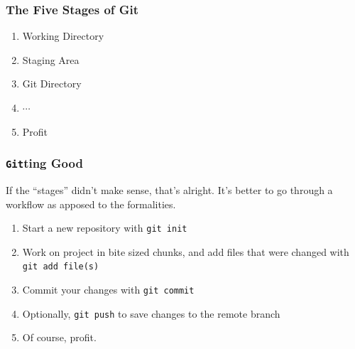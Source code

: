 \documentclass{beamer}
\newcommand{\shellcmd}[1]{\texttt{\colorbox{gray!30}{#1}}}
\begin{document}
\begin{frame}
    \frametitle{The Five Stages of Git}

    \begin{enumerate}
        \item Working Directory %
        \item Staging Area %
        \item Git Directory %
        \item $\cdots$
        \item Profit %
    \end{enumerate}
\end{frame}

\begin{frame}
    \frametitle{\shellcmd{Git}ting Good}

    If the ``stages'' didn't make sense, that's alright. It's better to go through a workflow as apposed to the formalities.

    \begin{enumerate}
        \item Start a new repository with \shellcmd{git init} %
        \item Work on project in bite sized chunks, and add files that were changed with \shellcmd{git add file(s)} %
        \item Commit your changes with \shellcmd{git commit} %
        \item Optionally, \shellcmd{git push} to save changes to the remote branch
        \item Of course, profit.
    \end{enumerate}
\end{frame}
\end{document}
